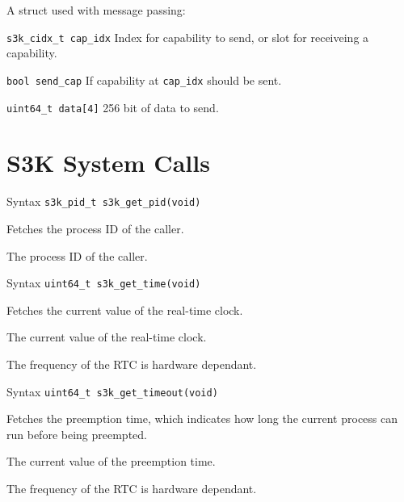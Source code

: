 \documentclass[a4paper,11pt]{article}
\newenvironment{syscalldoc}[1]{
  \begin{tcolorbox}[breakable,title=\subsection{\texttt{#1()}}]
  \begin{description}[leftmargin=!,style=nextline,noitemsep]
}{
  \end{description}
  \end{tcolorbox}
}
\newenvironment{structdoc}[2]{
  \begin{tcolorbox}[breakable,title=\subsection{\texttt{struct #1}}]
  #2
  \begin{description}[leftmargin=!,style=nextline,noitemsep]
}{
  \end{description}
  \end{tcolorbox}
}
\begin{document}
\begin{structdoc}{s3k\_msg\_t}{A struct used with message passing:}
  \item[\texttt{s3k\_cidx\_t cap\_idx}] Index for capability to send, or slot for receiveing a capability.
  \item[\texttt{bool send\_cap}] If capability at \texttt{cap\_idx} should be sent.
  \item[\texttt{uint64\_t data[4]}] 256 bit of data to send.
\end{structdoc}

\newpage
\section{S3K System Calls}

\begin{syscalldoc}{s3k\_get\_pid}
  \item[Syntax] \lstinline{s3k_pid_t s3k_get_pid(void)}
  \item[Description] Fetches the process ID of the caller.
  \item[Returns] The process ID of the caller.
\end{syscalldoc}

\begin{syscalldoc}{s3k\_get\_time}
  \item[Syntax] \lstinline{uint64_t s3k_get_time(void)}
  \item[Description] Fetches the current value of the real-time clock.
  \item[Returns] The current value of the real-time clock.
  \item[Notes] The frequency of the RTC is hardware dependant.
\end{syscalldoc}

\begin{syscalldoc}{s3k\_get\_timeout}
  \item[Syntax] \lstinline{uint64_t s3k_get_timeout(void)}
  \item[Description] Fetches the preemption time, which indicates how long the current process can run before being preempted.
  \item[Returns] The current value of the preemption time.
  \item[Notes] The frequency of the RTC is hardware dependant.
\end{syscalldoc}
\end{document}
